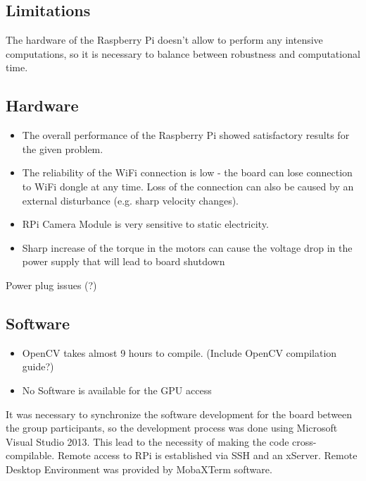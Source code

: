 \subsection{Limitations}

The hardware of the Raspberry Pi doesn't allow to perform any intensive
computations, so it is necessary to balance between robustness and
computational time.

\subsection{Hardware}

\begin{itemize}
  	\item The overall performance of the Raspberry Pi showed satisfactory
  	results for the given problem.
  	\item The reliability of the WiFi connection is low - the board can lose
  connection to WiFi dongle at any time. Loss of the connection can also be caused by an
external disturbance (e.g. sharp velocity changes).
	\item RPi Camera Module is very sensitive to static electricity.
	\item Sharp increase of the torque in the motors can cause the voltage drop in
	the power supply that will lead to board shutdown
\end{itemize}

Power plug issues (?)

\subsection{Software}

\begin{itemize}
  \item OpenCV takes almost 9 hours to compile. (Include OpenCV compilation
  guide?)
  \item No Software is available for the GPU access
\end{itemize}

It was necessary to synchronize the software development for the board between
the group participants, so the development process was done using Microsoft
Visual Studio 2013. This lead to the necessity of making the code
cross-compilable. Remote access to RPi is established via SSH and an xServer.
Remote Desktop Environment was provided by MobaXTerm software.